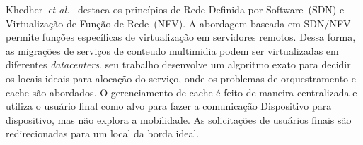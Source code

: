Khedher~\textit{et al.}~\cite{khedherComNet2017, khedherLCN2017} destaca os princípios de Rede Definida por Software~(SDN) e Virtualização de Função de Rede~(NFV). A abordagem baseada em SDN/NFV permite funções específicas de virtualização em servidores remotos. Dessa forma, as migrações de serviços de conteudo multimidia podem ser virtualizadas em diferentes \textit{datacenters}. seu trabalho desenvolve um algoritmo exato para decidir os locais ideais para alocação do serviço, onde os problemas de orquestramento e cache são abordados. 
O gerenciamento de cache é feito de maneira centralizada e utiliza o usuário final como alvo para fazer a comunicação Dispositivo para dispositivo, mas não explora a mobilidade. As solicitações de usuários finais são redirecionadas para um local da borda ideal. %



